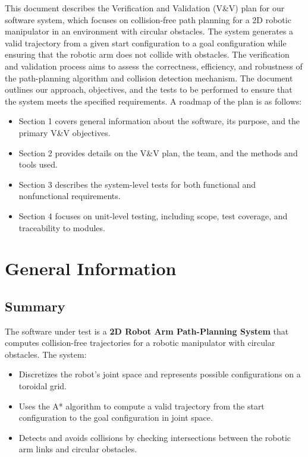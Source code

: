 \documentclass[12pt, titlepage]{article}
\begin{document}
\newpage


This document describes the Verification and Validation (V\&V) plan for our software system, which focuses on collision-free path planning for a 2D robotic manipulator in an environment with circular obstacles. The system generates a valid trajectory from a given start configuration to a goal configuration while ensuring that the robotic arm does not collide with obstacles. The verification and validation process aims to assess the correctness, efficiency, and robustness of the path-planning algorithm and collision detection mechanism.
The document outlines our approach, objectives, and the tests to be performed to ensure that the system meets the specified requirements. A roadmap of the plan is as follows:
\begin{itemize}
  \item Section 1 covers general information about the software, its purpose, and the primary V\&V objectives.
  \item Section 2 provides details on the V\&V plan, the team, and the methods and tools used.
  \item Section 3 describes the system-level tests for both functional and nonfunctional requirements.
  \item Section 4 focuses on unit-level testing, including scope, test coverage, and traceability to modules.
\end{itemize}

\section{General Information}

\subsection{Summary}
The software under test is a \textbf{2D Robot Arm Path-Planning System} that computes collision-free trajectories for a robotic manipulator with circular obstacles. The system:
\begin{itemize}
    \item Discretizes the robot’s joint space and represents possible configurations on a toroidal grid.
    \item Uses the A* algorithm to compute a valid trajectory from the start configuration to the goal configuration in joint space.
    \item Detects and avoids collisions by checking intersections between the robotic arm links and circular obstacles.
\end{itemize}
\end{document}

